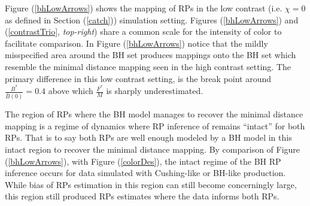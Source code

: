 %
Figure (\ref{bhLowArrows}) shows the mapping of RPs in the low contrast (i.e. $\chi=0$ as defined in Section (\ref{catch}))
simulation setting. Figures (\ref{bhLowArrows}) and (\ref{contrastTrio},
\emph{top-right}) share a common scale for the intensity of color to
facilitate comparison. In Figure (\ref{bhLowArrows}) notice that the mildly
misspecified area around the BH set produces mappings onto the BH set which
resemble the minimal distance mapping seen in the high contrast setting. %
The primary difference in this low contrast setting, is the break point
around $\frac{B^*}{\bar B(0)}=0.4$ above which $\frac{F^*}{M}$ is sharply
underestimated.

The region of RPs where the BH model manages to recover the minimal 
distance mapping is a regime of dynamics where RP inference of remains 
``intact'' for both RPs.
That is to say both RPs are well enough modeled by a BH model in this intact 
region to recover the minimal distance mapping. By comparison of 
Figure (\ref{bhLowArrows}), with Figure (\ref{colorDes}), the intact regime of 
the BH RP inference occurs for data simulated with Cushing-like or BH-like production. 
While bias of RPs estimation in this region can still become concerningly large, 
this region still produced RPs estimates where the data informs both RPs.

